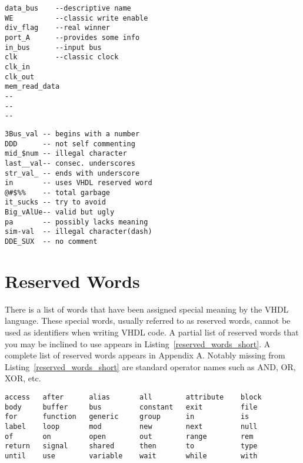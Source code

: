 \noindent
\begin{minipage}[lt]{0.49\linewidth}
\vspace{5pt}
\begin{lstlisting}[label=valid_identif, caption=Valid identifiers.]
data_bus	--descriptive name
WE			--classic write enable
div_flag	--real winner
port_A		--provides some info
in_bus		--input bus
clk			--classic clock
clk_in
clk_out
mem_read_data
--
--
--
\end{lstlisting}
\end{minipage}
\begin{minipage}[tr]{0.49\linewidth}
\vspace{5pt}
\begin{flushright}
\begin{lstlisting}[label=invalid_identif, caption=Invalid identifiers.]
3Bus_val -- begins with a number
DDD      -- not self commenting
mid_$num -- illegal character
last__val-- consec. underscores
str_val_ -- ends with underscore
in       -- uses VHDL reserved word
@#$%%    -- total garbage
it_sucks -- try to avoid
Big_vAlUe-- valid but ugly
pa       -- possibly lacks meaning
sim-val  -- illegal character(dash)
DDE_SUX  -- no comment
\end{lstlisting}
\end{flushright}
\end{minipage}

\section{Reserved Words}
There is a list of words that have been assigned special meaning by the VHDL language. These special words, usually referred to as reserved words, cannot be used as identifiers when writing VHDL code. A partial list of reserved words that you may be inclined to use appears in Listing~\ref{reserved_words_short}. A complete list of reserved words appears in Appendix A. Notably missing from Listing~\ref{reserved_words_short} are standard operator names such as AND, OR, XOR, etc.

\noindent
\begin{minipage}{0.99\linewidth}
\begin{lstlisting}[label=reserved_words_short, caption=A short list of VHDL reserved words.]
access   after      alias       all        attribute    block
body     buffer     bus         constant   exit         file
for      function   generic     group      in           is
label    loop       mod         new        next         null
of       on         open        out        range        rem
return   signal     shared      then       to           type
until    use        variable    wait       while        with
\end{lstlisting}
\end{minipage}

